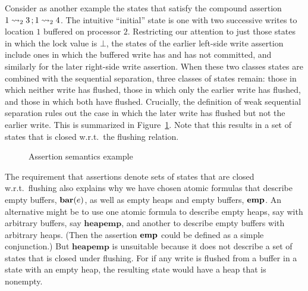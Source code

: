 \documentclass[11pt]{report}
\begin{document}
Consider as another example the states that satisfy the compound assertion $1 \leadsto_{2} 3 \operatorname{;} 1 \leadsto_{2} 4$. The intuitive ``initial'' state is one with two successive writes to location $1$ buffered on processor $2$. Restricting our attention to just those states in which the lock value is $\bot$, the states of the earlier left-side write assertion include ones in which the buffered write has and has not committed, and similarly for the later right-side write assertion. When these two classes states are combined with the sequential separation, three classes of states remain: those in which neither write has flushed, those in which only the earlier write has flushed, and those in which both have flushed. Crucially, the definition of weak sequential separation rules out the case in which the later write has flushed but not the earlier write. This is summarized in Figure~\ref{fig:leads-to-seq-example}. Note that this results in a set of states that is closed w.r.t.~the flushing relation. 
 
\begin{figure}[ht]
	\centering
	\caption{\label{fig:leads-to-seq-example}Assertion semantics example}
\end{figure}

The requirement that assertions denote sets of states that are closed w.r.t.~flushing also explains why we have chosen atomic formulas that describe empty buffers, $\mathbf{bar}(e)$, as well as empty heaps and empty buffers, $\mathbf{emp}$. An alternative might be to use one atomic formula to describe empty heaps, say with arbitrary buffers, say $\mathbf{heapemp}$, and another to describe empty buffers with arbitrary heaps. (Then the assertion $\mathbf{emp}$ could be defined as a simple conjunction.) But $\mathbf{heapemp}$ is unsuitable because it does not describe a set of states that is closed under flushing. For if any write is flushed from a buffer in a state with an empty heap, the resulting state would have a heap that is nonempty. 
\end{document}
